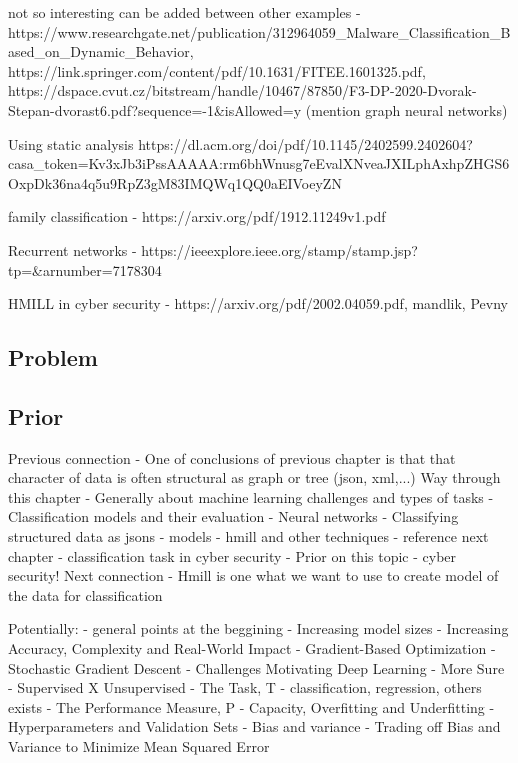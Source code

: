 not so interesting can be added between other examples - https://www.researchgate.net/publication/312964059_Malware_Classification_Based_on_Dynamic_Behavior, https://link.springer.com/content/pdf/10.1631/FITEE.1601325.pdf, https://dspace.cvut.cz/bitstream/handle/10467/87850/F3-DP-2020-Dvorak-Stepan-dvorast6.pdf?sequence=-1&isAllowed=y (mention graph neural networks)

Using static analysis https://dl.acm.org/doi/pdf/10.1145/2402599.2402604?casa_token=Kv3xJb3iPssAAAAA:rm6bhWnusg7eEvalXNveaJXILphAxhpZHGS6OxpDk36na4q5u9RpZ3gM83IMQWq1QQ0aEIVoeyZN

family classification - https://arxiv.org/pdf/1912.11249v1.pdf

Recurrent networks - https://ieeexplore.ieee.org/stamp/stamp.jsp?tp=&arnumber=7178304

HMILL in cyber security - https://arxiv.org/pdf/2002.04059.pdf, mandlik, Pevny

\subsection{Problem}
\subsection{Prior}






Previous connection
- One of conclusions of previous chapter is that that character of data is often structural as graph or tree (json, xml,...)
Way through this chapter
- Generally about machine learning challenges and types of tasks
- Classification models and their evaluation
- Neural networks
- Classifying structured data as jsons - models
    - hmill and other techniques - reference next chapter
- classification task in cyber security
- Prior on this topic - cyber security!
Next connection
- Hmill is one what we want to use to create model of the data for classification


\cite{GoodBengCour16}
Potentially:
- general points at the beggining
    - Increasing model sizes
    - Increasing Accuracy, Complexity and Real-World Impact
    - Gradient-Based Optimization
    - Stochastic Gradient Descent
    - Challenges Motivating Deep Learning
- More Sure
    - Supervised X Unsupervised
    - The Task, T - classification, regression, others exists
    - The Performance Measure, P
    - Capacity, Overfitting and Underfitting
    - Hyperparameters and Validation Sets
    - Bias and variance - Trading off Bias and Variance to Minimize Mean Squared
    Error


